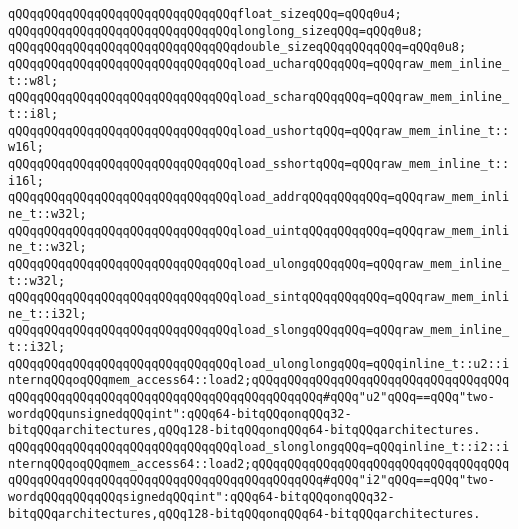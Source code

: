 \verb|qQQqqQQqqQQqqQQqqQQqqQQqqQQqqQQqfloat_sizeqQQq=qQQq0u4;|\newline
\newline
\verb|qQQqqQQqqQQqqQQqqQQqqQQqqQQqqQQqlonglong_sizeqQQq=qQQq0u8;|\newline
\verb|qQQqqQQqqQQqqQQqqQQqqQQqqQQqqQQqdouble_sizeqQQqqQQqqQQq=qQQq0u8;|\newline
\newline
\newline
\verb|qQQqqQQqqQQqqQQqqQQqqQQqqQQqqQQqload_ucharqQQqqQQq=qQQqraw_mem_inline_t::w8l;|\newline
\verb|qQQqqQQqqQQqqQQqqQQqqQQqqQQqqQQqload_scharqQQqqQQq=qQQqraw_mem_inline_t::i8l;|\newline
\newline
\verb|qQQqqQQqqQQqqQQqqQQqqQQqqQQqqQQqload_ushortqQQq=qQQqraw_mem_inline_t::w16l;|\newline
\verb|qQQqqQQqqQQqqQQqqQQqqQQqqQQqqQQqload_sshortqQQq=qQQqraw_mem_inline_t::i16l;|\newline
\newline
\verb|qQQqqQQqqQQqqQQqqQQqqQQqqQQqqQQqload_addrqQQqqQQqqQQq=qQQqraw_mem_inline_t::w32l;|\newline
\verb|qQQqqQQqqQQqqQQqqQQqqQQqqQQqqQQqload_uintqQQqqQQqqQQq=qQQqraw_mem_inline_t::w32l;|\newline
\verb|qQQqqQQqqQQqqQQqqQQqqQQqqQQqqQQqload_ulongqQQqqQQq=qQQqraw_mem_inline_t::w32l;|\newline
\verb|qQQqqQQqqQQqqQQqqQQqqQQqqQQqqQQqload_sintqQQqqQQqqQQq=qQQqraw_mem_inline_t::i32l;|\newline
\verb|qQQqqQQqqQQqqQQqqQQqqQQqqQQqqQQqload_slongqQQqqQQq=qQQqraw_mem_inline_t::i32l;|\newline
\newline
\verb|qQQqqQQqqQQqqQQqqQQqqQQqqQQqqQQqload_ulonglongqQQq=qQQqinline_t::u2::internqQQqoqQQqmem_access64::load2;qQQqqQQqqQQqqQQqqQQqqQQqqQQqqQQqqQQqqQQqqQQqqQQqqQQqqQQqqQQqqQQqqQQqqQQqqQQqqQQq#qQQq"u2"qQQq==qQQq"two-wordqQQqunsignedqQQqint":qQQq64-bitqQQqonqQQq32-bitqQQqarchitectures,qQQq128-bitqQQqonqQQq64-bitqQQqarchitectures.|\newline
\verb|qQQqqQQqqQQqqQQqqQQqqQQqqQQqqQQqload_slonglongqQQq=qQQqinline_t::i2::internqQQqoqQQqmem_access64::load2;qQQqqQQqqQQqqQQqqQQqqQQqqQQqqQQqqQQqqQQqqQQqqQQqqQQqqQQqqQQqqQQqqQQqqQQqqQQqqQQq#qQQq"i2"qQQq==qQQq"two-wordqQQqqQQqqQQqsignedqQQqint":qQQq64-bitqQQqonqQQq32-bitqQQqarchitectures,qQQq128-bitqQQqonqQQq64-bitqQQqarchitectures.|\newline
